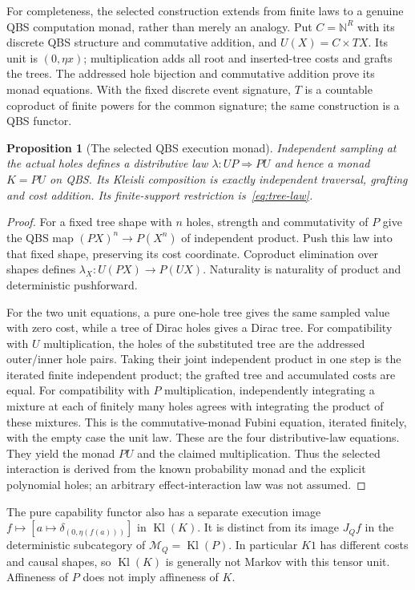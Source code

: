 \documentclass[11pt,a4paper]{article}
\newtheorem{proposition}[theorem]{Proposition}
\theoremstyle{definition}
\begin{document}
For completeness, the selected construction extends from finite laws to
a genuine QBS computation monad, rather than merely an analogy. Put
$C=\mathbb N^R$ with its discrete QBS structure and commutative addition,
and $U(X)=C\times TX$. Its unit is $(0,\eta x)$; multiplication adds
all root and inserted-tree costs and grafts the trees. The addressed hole
bijection and commutative addition prove its monad equations. With the
fixed discrete event signature, $T$ is a countable coproduct of finite
powers for the common signature; the same construction is a QBS functor.

\begin{proposition}[The selected QBS execution monad]\label{prop:qbs-execution}
Independent sampling at the actual holes defines a distributive law
$\lambda:UP\Rightarrow PU$ and hence a monad $K=PU$ on QBS. Its Kleisli
composition is exactly independent traversal, grafting and cost addition.
Its finite-support restriction is~\eqref{eq:tree-law}.
\end{proposition}
\begin{proof}
For a fixed tree shape with $n$ holes, strength and commutativity of $P$
give the QBS map $(PX)^n\to P(X^n)$ of independent product. Push this
law into that fixed shape, preserving its cost coordinate. Coproduct
elimination over shapes defines $\lambda_X:U(PX)\to P(UX)$.
Naturality is naturality of product and deterministic pushforward.

For the two unit equations, a pure one-hole tree gives the same sampled
value with zero cost, while a tree of Dirac holes gives a Dirac tree.
For compatibility with $U$ multiplication, the holes of the substituted
tree are the addressed outer/inner hole pairs. Taking their joint
independent product in one step is the iterated finite independent product;
the grafted tree and accumulated costs are equal. For compatibility with
$P$ multiplication, independently integrating a mixture at each of finitely
many holes agrees with integrating the product of these mixtures. This is
the commutative-monad Fubini equation, iterated finitely, with the empty
case the unit law. These are the four distributive-law equations. They
yield the monad $PU$ and the claimed multiplication. Thus the selected
interaction is derived from the known probability monad and the explicit
polynomial holes; an arbitrary effect-interaction law was not assumed.
\end{proof}
The pure capability functor also has a separate execution image
$f\mapsto[a\mapsto\delta_{(0,\eta(f(a)))}]$ in $\operatorname{Kl}(K)$.
It is distinct from its image $J_Qf$ in the deterministic subcategory of
$\mathcal M_Q=\operatorname{Kl}(P)$. In particular $K1$ has different
costs and causal shapes, so $\operatorname{Kl}(K)$ is generally not Markov
with this tensor unit. Affineness of $P$ does not imply affineness of $K$.
\end{document}
